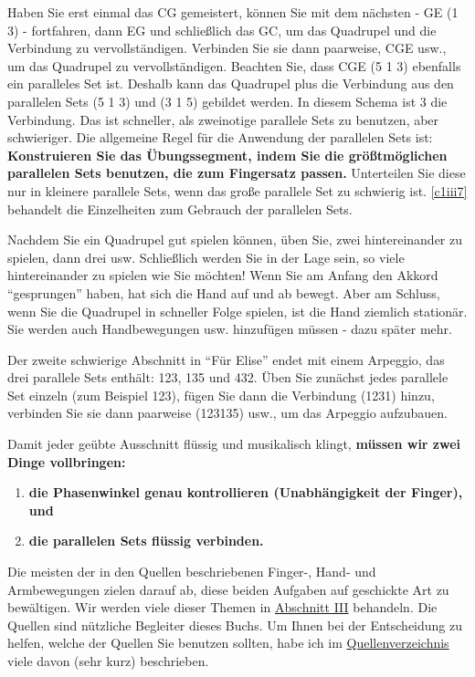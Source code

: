 Haben Sie erst einmal das CG gemeistert, können Sie mit dem nächsten - GE (1 3) - fortfahren, dann EG und schließlich das GC, um das Quadrupel und die Verbindung zu vervollständigen.
Verbinden Sie sie dann paarweise, CGE usw., um das Quadrupel zu vervollständigen.
Beachten Sie, dass CGE (5 1 3) ebenfalls ein paralleles Set ist.
Deshalb kann das Quadrupel plus die Verbindung aus den parallelen Sets (5 1 3) und (3 1 5) gebildet werden.
In diesem Schema ist 3 die Verbindung.
Das ist schneller, als zweinotige parallele Sets zu benutzen, aber schwieriger.
Die allgemeine Regel für die Anwendung der parallelen Sets ist: \textbf{Konstruieren Sie das Übungssegment, indem Sie die größtmöglichen parallelen Sets benutzen, die zum Fingersatz passen.}
Unterteilen Sie diese nur in kleinere parallele Sets, wenn das große parallele Set zu schwierig ist.
\hyperref[c1iii7]{\autoref{c1iii7}} behandelt die Einzelheiten zum Gebrauch der parallelen Sets.

Nachdem Sie ein Quadrupel gut spielen können, üben Sie, zwei hintereinander zu spielen, dann drei usw.
Schließlich werden Sie in der Lage sein, so viele hintereinander zu spielen wie Sie möchten!
Wenn Sie am Anfang den Akkord \enquote{gesprungen} haben, hat sich die Hand auf und ab bewegt.
Aber am Schluss, wenn Sie die Quadrupel in schneller Folge spielen, ist die Hand ziemlich stationär.
Sie werden auch Handbewegungen usw. hinzufügen müssen - dazu später mehr.

Der zweite schwierige Abschnitt in \enquote{Für Elise} endet mit einem Arpeggio, das drei parallele Sets enthält: 123, 135 und 432.
Üben Sie zunächst jedes parallele Set einzeln (zum Beispiel 123), fügen Sie dann die Verbindung (1231) hinzu, verbinden Sie sie dann paarweise (123135) usw., um das Arpeggio aufzubauen.

Damit jeder geübte Ausschnitt flüssig und musikalisch klingt, \textbf{müssen wir zwei Dinge vollbringen:}

\begin{enumerate}[label={\arabic*.}] 
\item \textbf{die Phasenwinkel genau kontrollieren (Unabhängigkeit der Finger), und}
\item \textbf{die parallelen Sets flüssig verbinden.}
 \end{enumerate}

Die meisten der in den Quellen beschriebenen Finger-, Hand- und Armbewegungen zielen darauf ab, diese beiden Aufgaben auf geschickte Art zu bewältigen.
Wir werden viele dieser Themen in \hyperref[c1iii1]{Abschnitt III} behandeln.
Die Quellen sind nützliche Begleiter dieses Buchs.
Um Ihnen bei der Entscheidung zu helfen, welche der Quellen Sie benutzen sollten, habe ich im \hyperref[reference]{Quellenverzeichnis} viele davon (sehr kurz) beschrieben.

